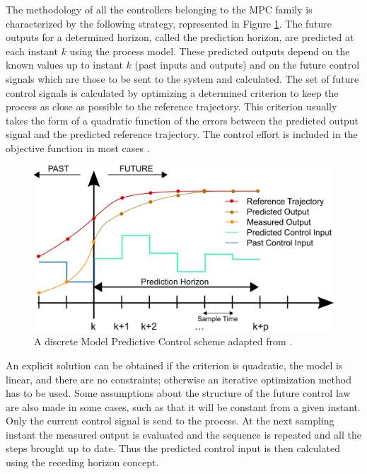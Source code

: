 The methodology of all the controllers belonging to the MPC family is characterized by the following strategy, represented in Figure \ref{fig:mpc_theory}. The future outputs for a  determined horizon, called  the  prediction horizon, are predicted at each instant $k$ using the process model. These predicted outputs depend on the known values up to instant $k$ (past inputs and outputs) and on the future control signals which are those to be sent to the system and calculated. The set of future control signals is calculated by optimizing a determined criterion to keep the process as close as possible to the reference trajectory. This criterion usually takes the form of a quadratic function of the errors between the predicted output signal and the predicted reference trajectory. The control effort is included in the objective function in most cases \cite{camacho2013model}. 
\begin{figure}[!h]
	\centering
	\includegraphics[width=\textwidth]{./figure/mpc_theory.png}
	\caption{A discrete Model Predictive Control scheme adapted from \cite{mpctoolbox}.}
	\label{fig:mpc_theory}
\end{figure}

An explicit solution can be obtained if the criterion is quadratic, the model is linear, and there are no constraints; otherwise an iterative optimization method has to be used. Some assumptions about the structure of the future control law are also made in some cases, such as that it will be constant from a given instant. Only the current control signal is send to the process. At the next sampling instant the measured output is evaluated and the sequence is repeated and all the steps brought up to date. Thus the predicted control input is then calculated using the receding horizon concept.



